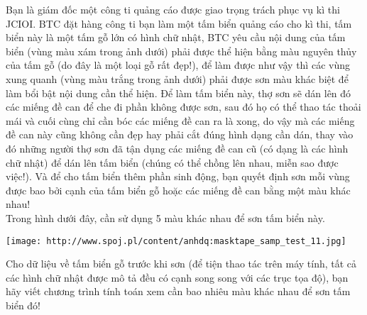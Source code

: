 Bạn là giám đốc một công ti quảng cáo được giao trọng trách phục vụ kì thi JCIOI. BTC đặt hàng công ti bạn làm một tấm biển quảng cáo cho kì thi, tấm biển này là một tấm gỗ lớn có hình chữ nhật, BTC yêu cầu nội dung của tấm biển (vùng màu xám trong ảnh dưới) phải được thể hiện bằng màu nguyên thủy của tấm gỗ (do đây là một loại gỗ rất đẹp!), để làm được như vậy thì các vùng xung quanh (vùng màu trắng trong ảnh dưới) phải được sơn màu khác biệt để làm bổi bật nội dung cần thể hiện. Để làm tấm biển này, thợ sơn sẽ dán lên đó các miếng đề can để che đi phần không được sơn, sau đó họ có thể thao tác thoải mái và cuối cùng chỉ cần bóc các miếng đề can ra là xong, do vậy mà các miếng đề can này cũng không cần đẹp hay phải cắt đúng hình dạng cần dán, thay vào đó những người thợ sơn đã tận dụng các miếng đề can cũ (có dạng là các hình chữ nhật) để dán lên tấm biển (chúng có thể chồng lên nhau, miễn sao được việc!). Và để cho tấm biển thêm phần sinh động, bạn quyết định sơn mỗi vùng được bao bởi cạnh của tấm biển gỗ hoặc các miếng đề can bằng một màu khác nhau!   
\\   Trong hình dưới đây, cần sử dụng 5 màu khác nhau để sơn tấm biển này.  


\texttt{[image: http://www.spoj.pl/content/anhdq:masktape\_samp\_test\_11.jpg]}



   Cho dữ liệu về tấm biển gỗ trước khi sơn (để tiện thao tác trên máy tính, tất cả các hình chữ nhật được mô tả đều có cạnh song song với các trục tọa độ), bạn hãy viết chương trình tính toán xem cần bao nhiêu màu khác nhau để sơn tấm biển đó!